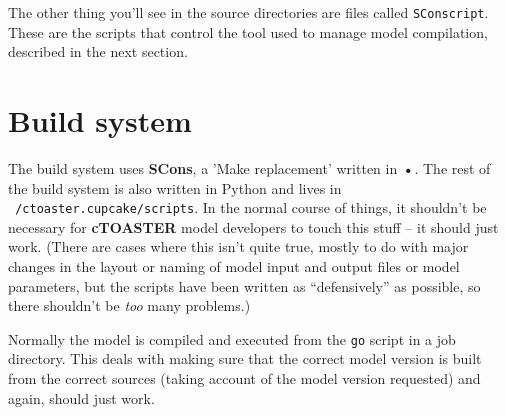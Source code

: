 \documentclass[a4paper,10pt,article]{memoir}
\begin{document}
The other thing you'll see in the source directories are files called
\texttt{SConscript}.  These are the scripts that control the tool used
to manage model compilation, described in the next section.

\section{Build system}
\label{sec:build-system}

The build system uses \textbf{SCons}, a 'Make replacement' written in
\textbf{•}.  The rest of the build system is also written in Python
and lives in \texttt{~/ctoaster.cupcake/scripts}.  In the normal course of
things, it shouldn't be necessary for \textbf{cTOASTER} model developers to touch
this stuff -- it should just work.  (There are cases where this isn't
quite true, mostly to do with major changes in the layout or naming of
model input and output files or model parameters, but the scripts have
been written as ``defensively'' as possible, so there shouldn't be
\emph{too} many problems.)

Normally the model is compiled and executed from the \texttt{go}
script in a job directory.  This deals with making sure that the
correct model version is built from the correct sources (taking
account of the model version requested) and again, should just work.
\end{document}
